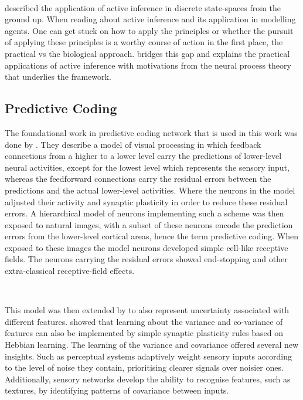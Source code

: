 \documentclass{article}
\begin{document}
\

\citet{dacosta2020active} described the application of active inference in discrete state-spaces from the ground up. When reading about active inference and its application in modelling agents. One can get stuck on how to apply the principles or whether the pursuit of applying these principles is a worthy course of action in the first place, the practical vs the biological approach. \citet{dacosta2020active} bridges this gap and explains the practical applications of active inference with motivations from the neural process theory that underlies the framework. 

\subsection{Predictive Coding}

The foundational work in predictive coding network that is used in this work was done by \citet{rao1999predictive}. They describe a model of visual processing in which feedback connections from a higher to a lower level carry the predictions of lower-level neural activities, except for the lowest level which represents the sensory input, whereas the feedforward connections carry the residual errors between the predictions and the actual lower-level activities. Where the neurons in the model adjusted their activity and synaptic plasticity in order to reduce these residual errors. A hierarchical model of neurons implementing such a scheme was then exposed to natural images, with a subset of these neurons encode the prediction errors from the lower-level cortical areas, hence the term predictive coding. When exposed to these images the model neurons developed simple cell-like receptive fields. The neurons carrying the residual errors showed end-stopping and other extra-classical receptive-field effects.

\

This model was then extended by \citet{friston2005theory} to also represent uncertainty associated with different features. \citet{friston2005theory} showed that learning about the variance and co-variance of features can also be implemented by simple synaptic plasticity rules based on Hebbian learning. The learning of the variance and covariance offered several new insights. Such as perceptual systems adaptively weight sensory inputs according to the level of noise they contain, prioritising clearer signals over noisier ones. Additionally, sensory networks develop the ability to recognise features, such as textures, by identifying patterns of covariance between inputs.
\end{document}
